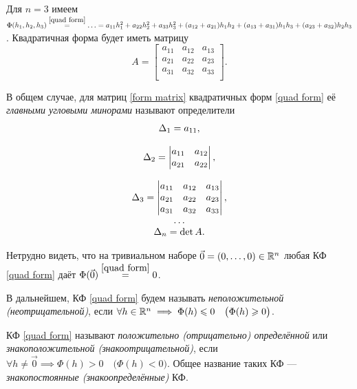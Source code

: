 \documentclass[../../main.tex]{subfiles}
\begin{document}
	\begin{exmp}
		Для $n = 3$ имеем $\Phi(h_1, h_2, h_3) \stk{quad form}{=} \ldots
		= a_{1 1} h_1^2 + a_{2 2} h_2^2 + a_{3 3} h_3^2
		+ (a_{1 2} + a_{2 1}) h_1 h_2 + (a_{1 3} + a_{3 1}) h_1 h_3
		+ (a_{2 3} + a_{3 2}) h_2 h_3$.
		Квадратичная форма будет иметь матрицу
		\[
			A =
			\begin{bmatrix}
				a_{1 1} & a_{1 2} & a_{1 3} \\
				a_{2 1} & a_{2 2} & a_{2 3} \\
				a_{3 1} & a_{3 2} & a_{3 3} \\
			\end{bmatrix}.
		\]
	\end{exmp}
	В общем случае, для матриц \eqref{form matrix} квадратичных форм
	\eqref{quad form} её \emph{главными угловыми минорами} называют
	определители
	\begin{equation}
	\label{main corner minors}
	\begin{array}{c}
		\Delta_1 = a_{1 1}, \\ \\
		\Delta_2 =
		\begin{vmatrix}
			a_{1 1} & a_{1 2} \\
			a_{2 1} & a_{2 2} \\
		\end{vmatrix}, \\ \\
		\Delta_3 =
		\begin{vmatrix}
			a_{1 1} & a_{1 2} & a_{1 3} \\
			a_{2 1} & a_{2 2} & a_{2 3} \\
			a_{3 1} & a_{3 2} & a_{3 3} \\
		\end{vmatrix}, \\
		\dots \\
		\Delta_n = \det A.
    \end{array}
	\end{equation}
	
	Нетрудно видеть, что на тривиальном наборе
	$\vec{0} = (0, \ldots, 0) \in \mathbb{R}^n$ любая КФ \eqref{quad form}
	даёт $\Phi(\vec{0}) \stk{quad form}{=} 0$.
	
	В дальнейшем, КФ \eqref{quad form} будем называть \emph{неположительной
	(неотрицательной)}, если $\forall h \in \mathbb{R}^n \implies
	\Phi(h) \leqslant 0
	\quad \big(\Phi(h) \geqslant 0\big)$.
	
	КФ \eqref{quad form} называют \emph{положительно (отрицательно) определённой}
	или \emph{знакоположительной (знакоотрицательной)},
	если $\forall h \ne \vec{0} \implies \Phi(h) > 0 \quad \big(\Phi(h) < 0\big)$.
	Общее название таких КФ --- \emph{знакопостоянные (знакоопределённые)} КФ.
	
\end{document}
